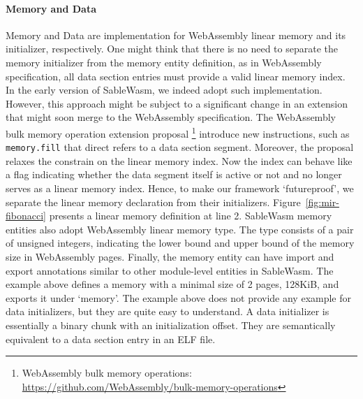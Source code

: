 \paragraph{Memory and Data}
Memory and Data are implementation for WebAssembly linear memory and its initializer, respectively. One might think that there is no need to separate the memory initializer from the memory entity definition, as in WebAssembly specification, all data section entries must provide a valid linear memory index. In the early version of SableWasm, we indeed adopt such implementation. However, this approach might be subject to a significant change in an extension that might soon merge to the WebAssembly specification. The WebAssembly bulk memory operation extension proposal \footnote{WebAssembly bulk memory operations: \\\url{https://github.com/WebAssembly/bulk-memory-operations}} introduce new instructions, such as \texttt{memory.fill} that direct refers to a data section segment. Moreover, the proposal relaxes the constrain on the linear memory index. Now the index can behave like a flag indicating whether the data segment itself is active or not and no longer serves as a linear memory index. Hence, to make our framework `futureproof', we separate the linear memory declaration from their initializers. Figure~\ref{fig:mir-fibonacci} presents a linear memory definition at line 2. SableWasm memory entities also adopt WebAssembly linear memory type. The type consists of a pair of unsigned integers, indicating the lower bound and upper bound of the memory size in WebAssembly pages. Finally, the memory entity can have import and export annotations similar to other module-level entities in SableWasm. The example above defines a memory with a minimal size of 2 pages, 128KiB, and exports it under `memory'. The example above does not provide any example for data initializers, but they are quite easy to understand. A data initializer is essentially a binary chunk with an initialization offset. They are semantically equivalent to a data section entry in an ELF file.

